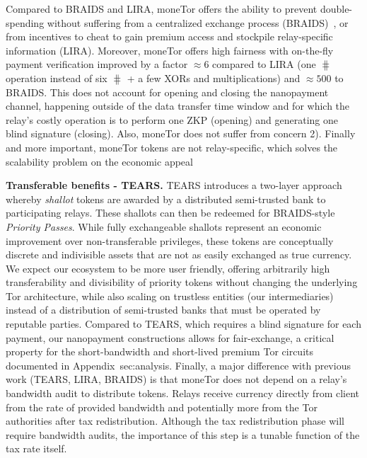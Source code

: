 Compared to BRAIDS and LIRA, moneTor offers the ability to prevent double-spending without suffering from a centralized exchange process (BRAIDS)~\cite{jansenblogpost}, or from incentives to cheat to gain premium access and stockpile relay-specific information (LIRA).
Moreover, moneTor offers high fairness with on-the-fly payment verification improved by a factor $\approx 6$ compared to LIRA (one $\hash$ operation instead of six $\hash$ + a few XORs and multiplications) and $\approx 500$ to BRAIDS.
This does not account for opening and closing the nanopayment channel, happening outside of the data transfer time window and for which the relay's costly operation is to perform one ZKP (opening) and generating one blind signature (closing).
Also, moneTor does not suffer from concern 2).
Finally and more important, moneTor tokens are not relay-specific, which solves the scalability problem on the economic appeal

\medskip\noindent\textbf{Transferable benefits - TEARS.}
TEARS introduces a two-layer approach whereby \emph{shallot} tokens are awarded by a distributed semi-trusted bank to participating relays.
These shallots can then be redeemed for BRAIDS-style \emph{Priority Passes}.
While fully exchangeable shallots represent an economic improvement over non-transferable privileges, these tokens are conceptually discrete and indivisible assets that are not as easily exchanged as true currency.
We expect our ecosystem to be more user friendly, offering arbitrarily high transferability and divisibility of priority tokens without changing the underlying Tor architecture, while also scaling on trustless entities (our intermediaries) instead of a distribution of semi-trusted banks that must be operated by reputable parties.
Compared to TEARS, which requires a blind signature for each payment, our nanopayment constructions allows for fair-exchange, a critical property for the short-bandwidth and short-lived premium Tor circuits documented in Appendix~{sec:analysis}.
Finally, a major difference with previous work (TEARS, LIRA, BRAIDS) is that moneTor does not depend on a relay's bandwidth audit to distribute tokens.
Relays receive currency directly from client from the rate of provided bandwidth and potentially more from the Tor authorities after tax redistribution.
Although the tax redistribution phase will require bandwidth audits, the importance of this step is a tunable function of the tax rate itself.

